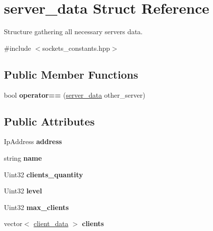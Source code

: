 \hypertarget{structserver__data}{}\section{server\+\_\+data Struct Reference}
\label{structserver__data}


Structure gathering all necessary server\textquotesingle{}s data.  




{\ttfamily \#include $<$sockets\+\_\+constants.\+hpp$>$}

\subsection*{Public Member Functions}
\begin{DoxyCompactItemize}
\item 
\mbox{\label{structserver__data_ab60a04a611acdc33ec920ddaaf371816}} 
bool {\bfseries operator==} (\hyperlink{structserver__data}{server\+\_\+data} other\+\_\+server)
\end{DoxyCompactItemize}
\subsection*{Public Attributes}
\begin{DoxyCompactItemize}
\item 
\mbox{\label{structserver__data_a712fc1b9a3898a7c4bbfc21421294db6}} 
Ip\+Address {\bfseries address}
\item 
\mbox{\label{structserver__data_a5e27298054d5800acadfcb7e6d3c0ba1}} 
string {\bfseries name}
\item 
\mbox{\label{structserver__data_a5c30a0a89bca53476f5d9a2e5a066d01}} 
Uint32 {\bfseries clients\+\_\+quantity}
\item 
\mbox{\label{structserver__data_a4f6ea4bfecf3fff77d3f47f7cc00f673}} 
Uint32 {\bfseries level}
\item 
\mbox{\label{structserver__data_ad05787b84f4f3c555c4852d32534b5f8}} 
Uint32 {\bfseries max\+\_\+clients}
\item 
\mbox{\label{structserver__data_aa1088fc39f82747376bec3ce469c38d8}} 
vector$<$ \hyperlink{structclient__data}{client\+\_\+data} $>$ {\bfseries clients}
\end{DoxyCompactItemize}
